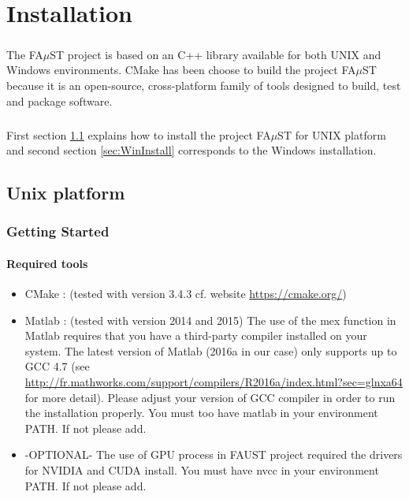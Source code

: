\chapter{Installation}\label{sec:install}

\paragraph{}The FA$\mu$ST project is based on an C++ library available for both UNIX and Windows environments. CMake has been choose to build the project FA$\mu$ST because it is an open-source, cross-platform family of tools designed to build, test and package software.

\paragraph{}First section \ref{sec:UnixInstall} explains how to install the project FA$\mu$ST for UNIX platform and second section \ref{sec:WinInstall} corresponds to the Windows installation. 

\section{Unix platform}\label{sec:UnixInstall}

\subsection{Getting Started}\label{sec:GettingStarted}

\subsubsection{Required tools}\label{sec:RequiredTools}

\begin{itemize}
\item CMake : (tested with version 3.4.3 cf. website \url{https://cmake.org/})
\item Matlab : (tested with version 2014 and 2015)
The use of the mex function in Matlab requires that you have a third-party compiler installed on your system. The latest version of Matlab (2016a in our case) only supports up to GCC 4.7 (see \url{http://fr.mathworks.com/support/compilers/R2016a/index.html?sec=glnxa64} for more detail). Please adjust your version of GCC compiler in order to run the installation properly. 
You must too have matlab in your environment PATH. If not please add. 

\item -OPTIONAL- The use of GPU process in FAUST project required the drivers for NVIDIA and CUDA install. You must have nvcc in your environment PATH. If not please add.
\end{itemize}

